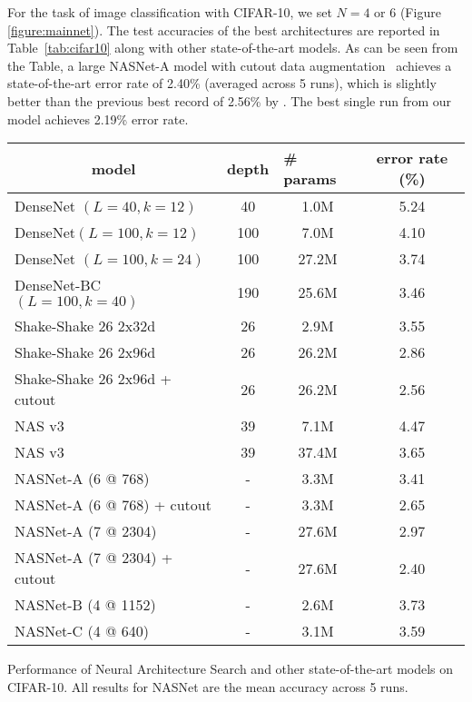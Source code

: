 \documentclass[10pt,twocolumn,letterpaper]{article}
\begin{document}
For the task of image classification with CIFAR-10, we set $N=4$ or 6 (Figure \ref{figure:mainnet}). The test accuracies of the best architectures are reported in Table~\ref{tab:cifar10} along with other state-of-the-art models. As can be seen from the Table, a large NASNet-A model with cutout data augmentation~\cite{devries2017improved} achieves a state-of-the-art error rate of 2.40\% (averaged across 5 runs), which is slightly better than the previous best record of 2.56\% by \cite{devries2017improved}. The best single run from our model achieves 2.19\% error rate.

\centering
\small
\begin{tabular}{l|cc|c}
\toprule
\multicolumn{1}{c|}{\bf model} & \multicolumn{1}{l}{\bf depth} & \multicolumn{1}{l|}{\bf \# params}  & \bf error rate (\%)  \\ \midrule
DenseNet $(L=40, k=12)$ \cite{Huang2016Densely} & 40 & 1.0M &  5.24  \\
DenseNet$(L=100, k=12)$ \cite{Huang2016Densely} & 100 & 7.0M &  4.10  \\
DenseNet $(L=100, k=24)$ \cite{Huang2016Densely} & 100 & 27.2M &  3.74  \\ 
DenseNet-BC $(L=100, k=40)$ \cite{Huang2016Densely} & 190 & 25.6M &  3.46  \\
\midrule
Shake-Shake 26 2x32d \cite{gastaldi17shakeshake} & 26 & 2.9M & 3.55 \\
Shake-Shake 26 2x96d \cite{gastaldi17shakeshake} & 26 & 26.2M & 2.86 \\
Shake-Shake 26 2x96d + cutout \cite{devries2017improved} & 26 & 26.2M & 2.56 \\
\midrule
NAS v3 \cite{zoph2017neural}& 39 & 7.1M & 4.47  \\
NAS v3 \cite{zoph2017neural}& 39 & 37.4M & 3.65 \\
\midrule
NASNet-A \;(6 @ 768) & - & 3.3M & 3.41 \\
NASNet-A \;(6 @ 768) + cutout & - & 3.3M & 2.65 \\
NASNet-A \;(7 @ 2304) & - & 27.6M & 2.97 \\
NASNet-A \;(7 @ 2304) + cutout & - & 27.6M & 2.40 \\
NASNet-B \;(4 @ 1152) & - & 2.6M & 3.73 \\
NASNet-C \;(4 @ 640) & - & 3.1M & 3.59 \\
\bottomrule
\end{tabular}
\vspace{0.2cm}
\caption{Performance of Neural Architecture Search and other state-of-the-art models on CIFAR-10. All results for NASNet are the mean accuracy across 5 runs.}
\end{document}
